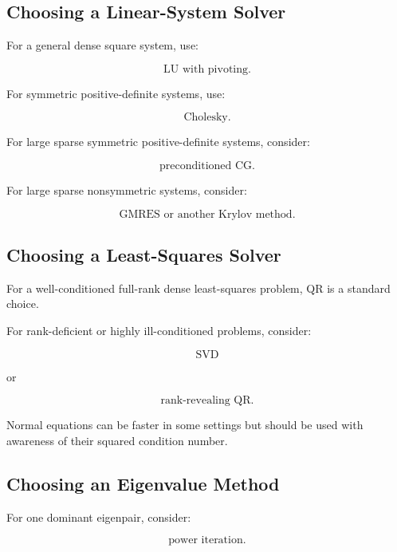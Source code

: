 \subsection{Choosing a Linear-System Solver}
\label{subsec:choosing-linear-system-solver}

For a general dense square system, use:

\[
\boxed{
\text{LU with pivoting}.
}
\]

For symmetric positive-definite systems, use:

\[
\boxed{
\text{Cholesky}.
}
\]

For large sparse symmetric positive-definite systems, consider:

\[
\boxed{
\text{preconditioned CG}.
}
\]

For large sparse nonsymmetric systems, consider:

\[
\boxed{
\text{GMRES or another Krylov method}.
}
\]

\subsection{Choosing a Least-Squares Solver}
\label{subsec:choosing-least-squares-solver}

For a well-conditioned full-rank dense least-squares problem, QR is a
standard choice.

For rank-deficient or highly ill-conditioned problems, consider:

\[
\boxed{
\text{SVD}
}
\]

or

\[
\boxed{
\text{rank-revealing QR}.
}
\]

Normal equations can be faster in some settings but should be used with
awareness of their squared condition number.

\subsection{Choosing an Eigenvalue Method}
\label{subsec:choosing-eigenvalue-method}

For one dominant eigenpair, consider:

\[
\boxed{
\text{power iteration}.
}
\]

